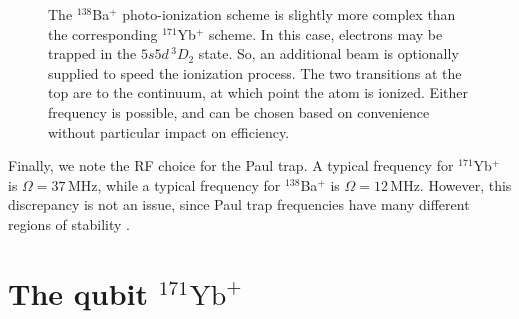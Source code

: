 \documentclass[12pt,a4paper]{amsart}
\numberwithin{equation}{section}
\theoremstyle{plain}
\theoremstyle{definition}
\begin{document}
\begin{figure}
\centering
{}
    \caption{The ${}^{138}$Ba$^+$ photo-ionization scheme is slightly more complex than the corresponding $^{171}$Yb$^+$ scheme. In this case, electrons may be trapped in the $5s5d\,^3D_2$ state. So, an additional beam is optionally supplied to speed the ionization process. The two transitions at the top are to the continuum, at which point the atom is ionized. Either frequency is possible, and can be chosen based on convenience without particular impact on efficiency.}
\label{fig:YbPhoto}
\end{figure}

Finally, we note the RF choice for the Paul trap. A typical frequency for $^{171}$Yb$^+$ is $\Omega = 37\,$MHz, while a typical frequency for ${}^{138}$Ba$^+$ is $\Omega = 12\,$MHz. However, this discrepancy is not an issue, since Paul trap frequencies have many different regions of stability \cite{miscQuanPap3}.


\section{The qubit ${}^{171}\mathrm{Yb}^+$}
\end{document}

